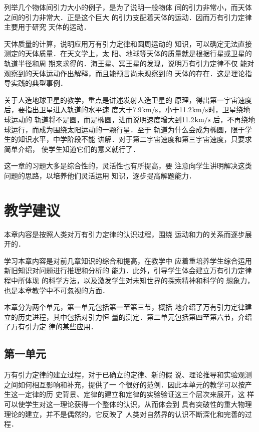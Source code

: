 列举几个物体间引力大小的例子，是为了说明一般物体
间的引力非常小，而天体之间的引力非常大．正是这个巨大
的引力支配着天体的运动．因而万有引力定律主要用于研究
天体的运动．

天体质量的计算，说明应用万有引力定律和圆周运动的
知识，可以确定无法直接测定的天体质量．在天文学上，太
阳、地球等天体的质量就是根据行星或卫星的轨道半径和周
期来求得的．海王星、冥王星的发现，说明万有引力定律不仅
能对观察到的天体运动作出解释，而且能预言尚未观察到的
天体的存在．这是理论指导实践的典型事例．

关于人造地球卫星的教学，重点是讲述发射人造卫星的
原理，得出第一宇宙速度后，要指出卫星进入轨道的水平速
度大于7.9${\rm km/s}$，小于11.2${\rm km/s}$时，卫星绕地球运动的
轨道将不是圆，而是椭圆，进而说明速度增大到11.2${\rm km/s}$
后，不再绕地球运行，而成为围绕太阳运动的一颗行星．至于
轨道为什么会成为椭圆，限于学生的知识水平，中学阶段不能
讲解．对于第二宇宙速度和第三宇宙速度，只要求简单介绍，
使学生知道它们的意义就行了．

这一章的习题大多是综合性的，灵活性也有所提高，要
注意向学生讲明解决这类问题的思路，以培养他们灵活运用
知识，逐步提高解题能力．

\section{教学建议}
本章内容是按照人类对万有引力定律的认识过程，围绕
运动和力的关系而逐步展开的．

学习本章内容是对前几章知识的综合和提高，在教学中
应着重培养学生综合运用新旧知识对问题进行推理和分析的
能力．此外，引导学生体会建立万有引力定律程中所体现
的科学方法，以及激发学生对未知世界的探索精神和科学的
想象力，也是本章教学中不可忽视的方面．

本章分为两个单元，第一单元包括第一至第三节，概括
地介绍了万有引力定律建立的历史进程，其中包括对引力恒
量的测定．第二单元包括第四至第六节，介绍了万有引力定
律的某些应用．

\subsection{第一单元}

万有引力定律的建立过程，对于已确立的定律、新的假
说、理论推导和实验观测之间如何相互影响和补充，提供了一
个很好的范例．因此本单元的教学可以按产生这一定律的历
史背景、定律的建立和定律的实验验证这三个层次来展开，这
样可以使学生对这一理论获得一个整体的认识，从而体会到
具有突破性的重大物理理论的建立，并不是偶然的，它反映了
人类对自然界的认识不断深化和完善的过程．


